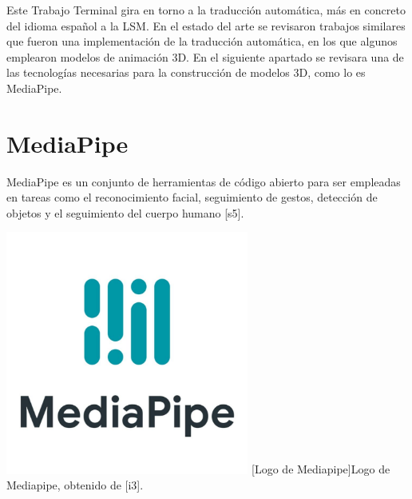 Este Trabajo Terminal gira en torno a la traducción automática, más en concreto del idioma español a la LSM. En el estado del arte se revisaron trabajos similares que fueron una implementación de la traducción automática, en los que algunos emplearon modelos de animación 3D. En el siguiente apartado se revisara una de las tecnologías necesarias para la construcción de modelos 3D, como lo es MediaPipe.\\

\section{MediaPipe}
MediaPipe es un conjunto de herramientas de código abierto para ser empleadas en tareas como el reconocimiento facial, seguimiento de gestos, detección de objetos y el seguimiento del cuerpo humano [s5].

\begin{center}
    \includegraphics[width=0.6\textwidth]{Images/Cap 2/MediaPipeLogo.jpeg}
    [Logo de Mediapipe]{Logo de Mediapipe, obtenido de [i3].} 
\end{center}


